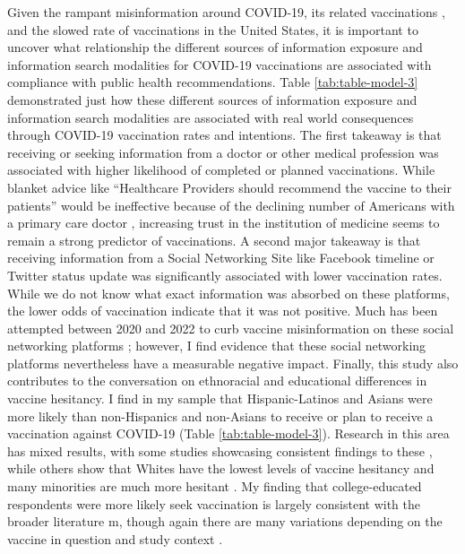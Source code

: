 Given the rampant misinformation around COVID-19, its related vaccinations
\citep{pathakInfodemicsCOVID19Role2020, mottaHowRightLeaningMedia2020,
shahsavariConspiracyTimeCorona2020}, and the slowed rate of vaccinations in the
United States, it is important to uncover what relationship the different
sources of information exposure and information search modalities for COVID-19
vaccinations are associated with compliance with public health recommendations.
Table \ref{tab:table-model-3} demonstrated just how these different sources of
information exposure and information search modalities are associated with real
world consequences through COVID-19 vaccination rates and intentions. The first
takeaway is that receiving or seeking information from a doctor or other medical
profession was associated with higher likelihood of completed or planned
vaccinations. While blanket advice like ``Healthcare Providers should recommend
the vaccine to their patients'' would be ineffective because of the declining
number of Americans with a primary care doctor \citep{levine_etal20}, increasing
trust in the institution of medicine seems to remain a strong predictor of
vaccinations. A second major takeaway is that receiving information from a
Social Networking Site like Facebook timeline or Twitter status update was
significantly associated with lower vaccination rates. While we do not know what
exact information was absorbed on these platforms, the lower odds of vaccination
indicate that it was not positive. Much has been attempted between 2020 and 2022
to curb vaccine misinformation on these social networking platforms
\citep[see][for an early example]{bowman20}; however, I find evidence that these
social networking platforms nevertheless have a measurable negative impact.
Finally, this study also contributes to the conversation on ethnoracial and
educational differences in vaccine hesitancy. I find in my sample that
Hispanic-Latinos and Asians were more likely than non-Hispanics and non-Asians
to receive or plan to receive a vaccination against COVID-19 (Table
\ref{tab:table-model-3}). Research in this area has mixed results, with some
studies showcasing consistent findings to these
\citep{bagasra_etal21,king_etal21}, while others show that Whites have the
lowest levels of vaccine hesitancy and many minorities are much more hesitant
\citep{momplaisir_etal21, foxworth21}. My finding that college-educated
respondents were more likely seek vaccination is largely consistent with the
broader literature m\citep{khairat_etal22}, though again there are many
variations depending on the vaccine in question and study context
\citep{siddiqui_etal13}.

